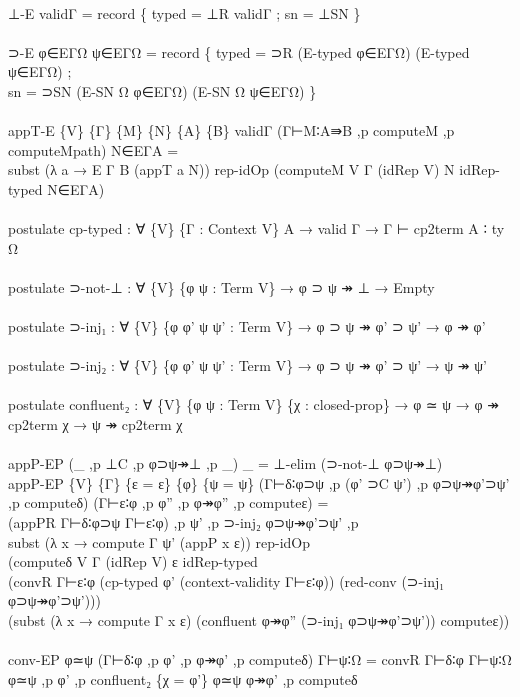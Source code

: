{\begin{code}
{\>\<\\
\>⊥-E validΓ = record \{ typed = ⊥R validΓ ; sn = ⊥SN \}\<\\
\>\<\\
\>⊃-E φ∈EΓΩ ψ∈EΓΩ = record \{ typed = ⊃R (E-typed φ∈EΓΩ) (E-typed ψ∈EΓΩ) ; \<\\
\>  sn = ⊃SN (E-SN Ω φ∈EΓΩ) (E-SN Ω ψ∈EΓΩ) \}\<\\
\>\<\\
\>appT-E \{V\} \{Γ\} \{M\} \{N\} \{A\} \{B\} validΓ (Γ⊢M∶A⇛B ,p computeM ,p computeMpath) N∈EΓA = \<\\
\>  subst (λ a → E Γ B (appT a N)) rep-idOp (computeM V Γ (idRep V) N idRep-typed N∈EΓA)\<\\
\>\<\\
\>postulate cp-typed : ∀ \{V\} \{Γ : Context V\} A → valid Γ → Γ ⊢ cp2term A ∶ ty Ω\<\\
\>\<\\
\>postulate ⊃-not-⊥ : ∀ \{V\} \{φ ψ : Term V\} → φ ⊃ ψ ↠ ⊥ → Empty\<\\
\>\<\\
\>postulate ⊃-inj₁ : ∀ \{V\} \{φ φ' ψ ψ' : Term V\} → φ ⊃ ψ ↠ φ' ⊃ ψ' → φ ↠ φ'\<\\
\>\<\\
\>postulate ⊃-inj₂ : ∀ \{V\} \{φ φ' ψ ψ' : Term V\} → φ ⊃ ψ ↠ φ' ⊃ ψ' → ψ ↠ ψ'\<\\
\>\<\\
\>postulate confluent₂ : ∀ \{V\} \{φ ψ : Term V\} \{χ : closed-prop\} → φ ≃ ψ → φ ↠ cp2term χ → ψ ↠ cp2term χ\<\\
\>\<\\
\>appP-EP (\_ ,p ⊥C ,p φ⊃ψ↠⊥ ,p \_) \_ = ⊥-elim (⊃-not-⊥ φ⊃ψ↠⊥)\<\\
\>appP-EP \{V\} \{Γ\} \{ε = ε\} \{φ\} \{ψ = ψ\} (Γ⊢δ∶φ⊃ψ ,p (φ' ⊃C ψ') ,p φ⊃ψ↠φ'⊃ψ' ,p computeδ) (Γ⊢ε∶φ ,p φ'' ,p φ↠φ'' ,p computeε) = \<\\
\>  (appPR Γ⊢δ∶φ⊃ψ Γ⊢ε∶φ) ,p ψ' ,p ⊃-inj₂ φ⊃ψ↠φ'⊃ψ' ,p \<\\
\>  subst (λ x → compute Γ ψ' (appP x ε)) rep-idOp \<\\
\>  (computeδ V Γ (idRep V) ε idRep-typed \<\\
\>    (convR Γ⊢ε∶φ (cp-typed φ' (context-validity Γ⊢ε∶φ)) (red-conv (⊃-inj₁ φ⊃ψ↠φ'⊃ψ')))\<\\
\>  (subst (λ x → compute Γ x ε) (confluent φ↠φ'' (⊃-inj₁ φ⊃ψ↠φ'⊃ψ')) computeε))\<\\
\>\<\\
\>conv-EP φ≃ψ (Γ⊢δ∶φ ,p φ' ,p φ↠φ' ,p computeδ) Γ⊢ψ∶Ω = convR Γ⊢δ∶φ Γ⊢ψ∶Ω φ≃ψ ,p φ' ,p confluent₂ \{χ = φ'\} φ≃ψ φ↠φ' ,p computeδ\<\\
}
\end{code}}
